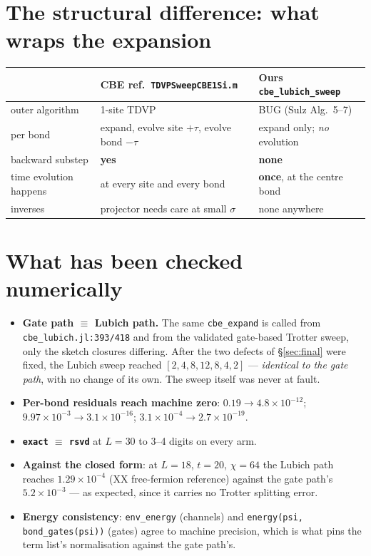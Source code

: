 \documentclass[11pt,a4paper]{article}
\newcommand{\code}[1]{\texttt{\small #1}}
\begin{document}
\section{The structural difference: what wraps the expansion}

\begin{center}
\begin{tabular}{@{}p{4.1cm}p{5.4cm}p{5.4cm}@{}}
\toprule
& \textbf{CBE ref.\ \code{TDVPSweepCBE1Si.m}} & \textbf{Ours \code{cbe\_lubich\_sweep}} \\
\midrule
outer algorithm & 1-site TDVP & BUG (Sulz Alg.\ 5--7) \\
per bond & expand, evolve site $+\tau$, evolve bond $-\tau$ & expand only; \emph{no} evolution \\
backward substep & \textbf{yes} & \textbf{none} \\
time evolution happens & at every site and every bond & \textbf{once}, at the centre bond \\
inverses & projector needs care at small $\sigma$ & none anywhere \\
\bottomrule
\end{tabular}
\end{center}

\section{What has been checked numerically}

\begin{itemize}[nosep,leftmargin=1.6em]
  \item \textbf{Gate path $\equiv$ Lubich path.} The same \code{cbe\_expand} is called from
        \code{cbe\_lubich.jl:393/418} and from the validated gate-based Trotter sweep, only the
        sketch closures differing. After the two defects of \S\ref{sec:final} were fixed, the
        Lubich sweep reached $[2,4,8,12,8,4,2]$ --- \emph{identical to the gate path}, with no
        change of its own. The sweep itself was never at fault.
  \item \textbf{Per-bond residuals reach machine zero}: $0.19\to4.8\times10^{-12}$;
        $9.97\times10^{-3}\to3.1\times10^{-16}$; $3.1\times10^{-4}\to2.7\times10^{-19}$.
  \item \textbf{\code{exact} $\equiv$ \code{rsvd}} at $L=30$ to 3--4 digits on every arm.
  \item \textbf{Against the closed form}: at $L=18$, $t=20$, $\chi=64$ the Lubich path reaches
        $1.29\times10^{-4}$ (XX free-fermion reference) against the gate path's
        $5.2\times10^{-3}$ --- as expected, since it carries no Trotter splitting error.
  \item \textbf{Energy consistency}: \code{env\_energy} (channels) and
        \code{energy(psi, bond\_gates(psi))} (gates) agree to machine precision, which is what
        pins the term list's normalisation against the gate path's.
\end{itemize}
\end{document}
